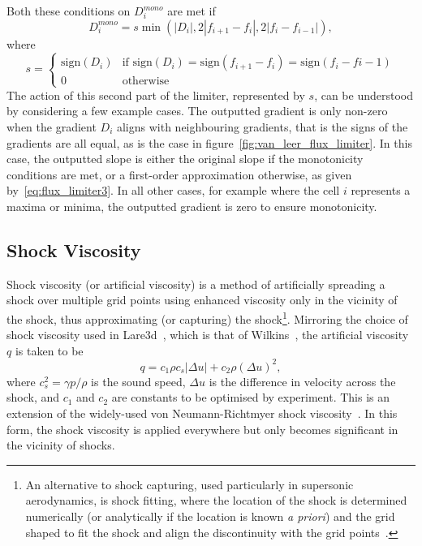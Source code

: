 Both these conditions on $D_i^{mono}$ are met if
\begin{equation}
  \label{eq:flux_limiter3}
D_i^{mono} = s \min(|D_i|, 2 | f_{i+1} - f_i |, 2 |f_i - f_{i-1}|),
\end{equation}
where
\begin{equation}
  \label{eq:flux_limiter4}
s =
\left\{
	\begin{array}{ll}
		\text{sign}(D_i)  & \mbox{if } \text{sign}(D_i) = \text{sign}(f_{i+1} - f_i) = \text{sign}(f_{i} - f{i-1}) \\
		0 & \mbox{otherwise}
	\end{array}
\right.
\end{equation}
The action of this second part of the limiter, represented by $s$, can be understood by considering a few example cases. The outputted gradient is only non-zero when the gradient $D_i$ aligns with neighbouring gradients, that is the signs of the gradients are all equal, as is the case in figure~\ref{fig:van_leer_flux_limiter}. In this case, the outputted slope is either the original slope if the monotonicity conditions are met, or a first-order approximation otherwise, as given by~\eqref{eq:flux_limiter3}. In all other cases, for example where the cell $i$ represents a maxima or minima, the outputted gradient is zero to ensure monotonicity.

\subsection{Shock Viscosity}

Shock viscosity (or artificial viscosity) is a method of artificially spreading a shock over multiple grid points using enhanced viscosity only in the vicinity of the shock, thus approximating (or capturing) the shock\footnote{An alternative to shock capturing, used particularly in supersonic aerodynamics, is shock fitting, where the location of the shock is determined numerically (or analytically if the location is known \emph{a priori}) and the grid shaped to fit the shock and align the discontinuity with the grid points~\cite{paciorriShockfittingTechnique2D2009}.}. Mirroring the choice of shock viscosity used in Lare3d~\cite{arberStaggeredGridLagrangian2001}, which is that of Wilkins~\cite{wilkinsUseArtificialViscosity1980a}, the artificial viscosity $q$ is taken to be
\begin{equation}
  \label{eq:artificial_viscosity}
q = c_1 \rho c_s | \Delta u | + c_2 \rho (\Delta u)^2,
\end{equation}
where $c_s^2 = \gamma p / \rho$ is the sound speed, $\Delta u$ is the difference in velocity across the shock, and $c_1$ and $c_2$ are constants to be optimised by experiment. This is an extension of the widely-used von Neumann-Richtmyer shock viscosity~\cite{vonneumannMethodNumericalCalculation1950}. In this form, the shock viscosity is applied everywhere but only becomes significant in the vicinity of shocks.

